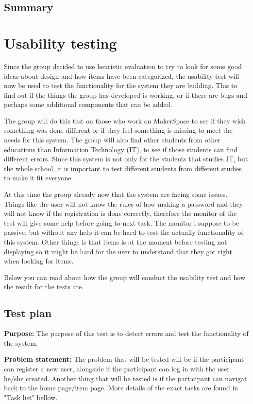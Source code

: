 
\subsection{Summary}


\section{Usability testing}
Since the group decided to use heuristic evaluation to try to look for some good ideas about design and how items have been 
categorized, the usability test will now be used to test the functionality for the system they are building. This to find out if the things the group has developed is working, or if there are bugs and perhaps some additional components that can be added.

The group will do this test on those who work on MakerSpace to see if they wish something was done different or if they feel something is missing to meet the needs for this system. The group will also find other students from other educations than Information Technology (IT), to see if those students can find different errors. Since this system is not only for the students that studies IT, but the whole school, it is important to test different students from different studies to make it fit everyone.

At this time the group already now that the system are facing some issues. Things like the user will not know the rules of how making a password and they will not know if the registration is done correctly, therefore the monitor of the test will give some help before going to next task. The monitor i suppose to be passive, but without any help it can be hard to test the actually functionality of this system. Other things is that items is at the moment before testing not displaying so it might be hard for the user to understand that they got right when looking for items.

Below you can read about how the group will conduct the usability test and how the result for the tests are.

\subsection{Test plan}
\textbf{Purpose:} The purpose of this test is to detect errors and test the functionality of the system.

\textbf{Problem statement:} The problem that will be tested will be if the participant can register a new user, alongside if the participant can log in with the user he/she created. Another thing that will be tested is if the participant can navigat back to the home page/item page. More details of the exact tasks are found in "Task list" bellow. 

